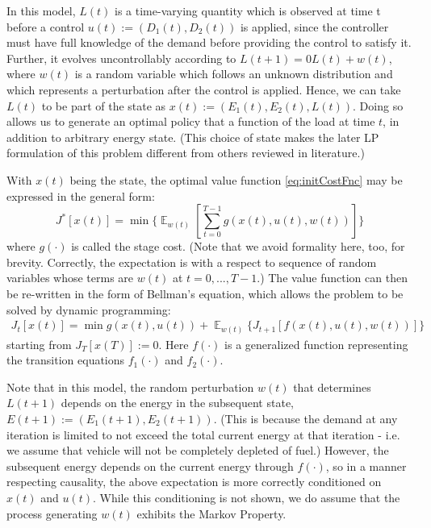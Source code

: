 \documentclass[conference]{IEEEtran}
\DeclareMathOperator{\E}{\mathbb{E}}
\begin{document}

In this model, $L(t)$ is a time-varying quantity which is observed at time t before a control $u(t):=(D_{1}(t),D_{2}(t))$ is applied, since the controller must have full knowledge of the demand before providing the control to satisfy it. Further, it evolves uncontrollably according to $L(t+1)=0L(t)+w(t)$, where $w(t)$ is a random variable which follows an unknown distribution and which represents a perturbation after the control is applied. Hence, we can take $L(t)$ to be part of the state as $x(t):=(E_{1}(t),E_{2}(t),L(t))$. Doing so allows us to generate an optimal policy that a function of the load at time $t$, in addition to arbitrary energy state. (This choice of state makes the later LP formulation of this problem different from others reviewed in literature.)

With $x(t)$ being the state, the optimal value function \eqref{eq:initCostFnc} may be expressed in the general form:
\begin{equation}J^{*}[x(t)]=\min \Biggl\{\mathop{\E}_{w(t)}\left[\sum_{t=0}^{T-1}g(x(t),u(t),w(t))\right]\Biggr\}\end{equation}
where $g(\cdot)$ is called the stage cost. (Note that we avoid formality here, too, for brevity. Correctly, the expectation is with a respect to sequence of random variables whose terms are $w(t)$ at $t=0,...,T-1$.) The value function can then be re-written in the form of Bellman's equation, which allows the problem to be solved by dynamic programming:
\begin{multline} \label{eq:FHDP}
J_{t}[x(t)]=\min g(x(t),u(t)) + \mathop{\E}_{w(t)} \{J_{t+1}[f(x(t),u(t),w(t))]\}
\end{multline}
starting from $J_{T}[x(T)]:=0$. Here $f(\cdot)$ is a generalized function representing the transition equations $f_{1}(\cdot)$ and $f_{2}(\cdot)$.

Note that in this model, the random perturbation $w(t)$ that determines $L(t+1)$ depends on the energy in the subsequent state, $E(t+1):=(E_{1}(t+1),E_{2}(t+1))$. (This is because the demand at any iteration is limited to not exceed the total current energy at that iteration - i.e. we assume that vehicle will not be completely depleted of fuel.) However, the subsequent energy depends on the current energy through $f(\cdot)$, so in a manner respecting causality, the above expectation is more correctly conditioned on $x(t)$ and $u(t)$. While this conditioning is not shown, we do assume that the process generating $w(t)$ exhibits the Markov Property.
\end{document}
